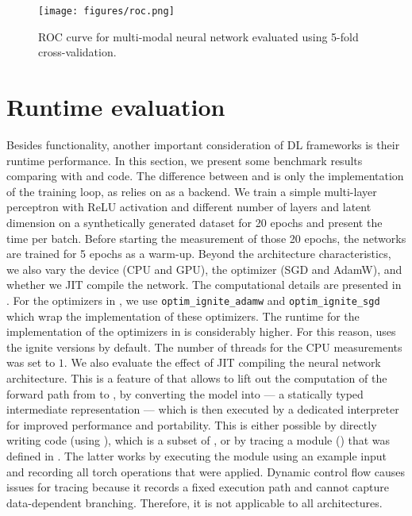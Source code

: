 \documentclass[article]{jss}
\theoremstyle{definition}
\begin{document}
\begin{figure}[H]
    \centering
    \texttt{[image: figures/roc.png]}
    \caption{ROC curve for multi-modal neural network evaluated using 5-fold cross-validation.}
    \label{fig:roc-curve}
\end{figure}

\section{Runtime evaluation}\label{sec:benchmarks}

Besides functionality, another important consideration of DL frameworks is their runtime performance.
In this section, we present some benchmark results comparing \mlrttorch{} with \torch{} and \pytorch{} code.
The difference between \mlrttorch{} and \torch{} is only the implementation of the training loop, as \mlrttorch{} relies on \torch{} as a backend.
We train a simple multi-layer perceptron with ReLU activation and different number of layers and latent dimension on a synthetically generated dataset for 20 epochs and present the time per batch.
Before starting the measurement of those 20 epochs, the networks are trained for 5 epochs as a warm-up.
Beyond the architecture characteristics, we also vary the device (CPU and GPU), the optimizer (SGD and AdamW), and whether we JIT compile the network.
The computational details are presented in .
For the optimizers in \rlang{}, we use \texttt{optim\_ignite\_adamw} and \texttt{optim\_ignite\_sgd} which wrap the \libtorch{} \cpp{} implementation of these optimizers.
The runtime for the \rlang{} implementation of the optimizers in \torch{} is considerably higher.
For this reason, \mlrttorch{} uses the ignite versions by default.
The number of threads for the CPU measurements was set to $1$.
We also evaluate the effect of JIT compiling the neural network architecture.
This is a feature of  that allows to lift out the computation of the forward path from  to \cpp{}, by converting the model into  — a statically typed intermediate representation — which is then executed by a dedicated \cpp{} interpreter for improved performance and portability.
This is either possible by directly writing  code (using ), which is a subset of , or by tracing a module () that was defined in .
The latter works by executing the module using an example input and recording all torch operations that were applied.
Dynamic control flow causes issues for tracing because it records a fixed execution path and cannot capture data-dependent branching.
Therefore, it is not applicable to all architectures.
\end{document}
